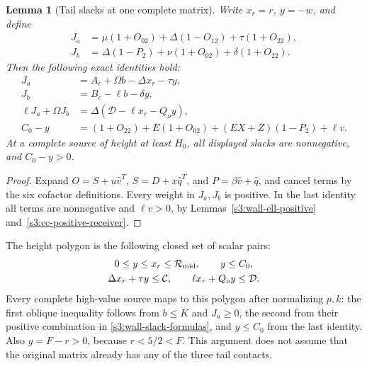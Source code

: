 \documentclass[11pt,reqno]{amsart}
\newtheorem{lemma}[theorem]{Lemma}
\theoremstyle{definition}
\theoremstyle{remark}
\begin{document}
\begin{lemma}[Tail slacks at one complete matrix]
\label{s3:wall-slack-identities}
Write \(x_r=r\), \(y=-w\), and define
\[
\begin{split}
 J_a&=\mu(1+O_{02})+\Delta(1-O_{12})+\tau(1+O_{22}),\\
 J_b&=\Delta(1-P_2)+\nu(1+O_{02})+\delta(1+O_{22}).
\end{split}
\]
Then the following exact identities hold:
\begin{equation}\label{s3:wall-slack-formulas}
\begin{split}
 J_a&=A_c+\Omega b-\Delta x_r-\tau y,\\
 J_b&=B_c-\ell b-\delta y,\\
 \ell J_a+\Omega J_b
 &=\Delta(\mathcal D-\ell x_r-Q_oy),\\
 C_0-y&=(1+O_{22})+E(1+O_{02})
               +(EX+Z)(1-P_2)+\ell v.
\end{split}
\end{equation}
At a complete source of height at least \(H_0\), all displayed
slacks are nonnegative, and \(C_0-y>0\).
\end{lemma}
\begin{proof}
Expand \(O=S+u\widehat v^T\), \(S=D+x\widehat q^T\),
and \(P=\beta\widehat v+\widehat q\), and cancel terms by the six
cofactor definitions. Every weight in \(J_a,J_b\) is positive.
In the last identity all terms are nonnegative and \(\ell v>0\),
by Lemmas~\ref{s3:wall-ell-positive} and~\ref{s3:cc-positive-receiver}.
\end{proof}

The height polygon is the following closed set of scalar pairs:
\begin{equation}\label{s3:wall-polygon}
\begin{gathered}
 0\le y\le x_r\le\mathcal R_{\rm mid},\qquad y\le C_0,\\
 \Delta x_r+\tau y\le\mathcal C,\qquad
 \ell x_r+Q_oy\le\mathcal D.
\end{gathered}
\end{equation}
Every complete high-value source maps to this polygon after
normalizing \(p,k\): the first oblique inequality follows from
\(b\le K\) and \(J_a\ge0\), the second from their positive
combination in \eqref{s3:wall-slack-formulas}, and \(y\le C_0\)
from the last identity. Also \(y=F-r>0\), because \(r<5/2<F\).
This argument does not assume that the original matrix already has
any of the three tail contacts.
\end{document}
